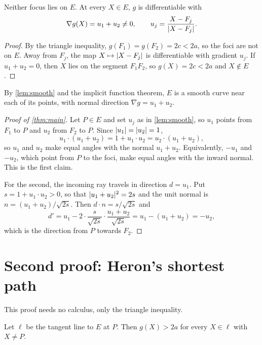 \documentclass[11pt,a4paper]{article}
\begin{document}
\begin{lemma}\label{lem:smooth}
  Neither focus lies on $E$. At every $X \in E$, $g$ is differentiable with
  \[
    \nabla g(X) = u_1 + u_2 \neq 0, \qquad
    u_j = \frac{X - F_j}{\lvert X - F_j\rvert}.
  \]
\end{lemma}

\begin{proof}
  By the triangle inequality, $g(F_1) = g(F_2) = 2c < 2a$, so the foci are not on
  $E$. Away from $F_j$, the map $X \mapsto \lvert X - F_j\rvert$ is differentiable with
  gradient $u_j$. If $u_1 + u_2 = 0$, then $X$ lies on the segment $F_1F_2$, so
  $g(X) = 2c < 2a$ and $X \notin E$.
\end{proof}

By \cref{lem:smooth} and the implicit function theorem, $E$ is a smooth curve near
each of its points, with normal direction $\nabla g = u_1 + u_2$.

\begin{proof}[Proof of \cref{thm:main}]
  Let $P \in E$ and set $u_j$ as in \cref{lem:smooth}, so $u_1$ points from $F_1$
  to $P$ and $u_2$ from $F_2$ to $P$. Since $\lvert u_1\rvert = \lvert u_2\rvert = 1$,
  \[
    u_1 \cdot (u_1 + u_2) = 1 + u_1 \cdot u_2 = u_2 \cdot (u_1 + u_2),
  \]
  so $u_1$ and $u_2$ make equal angles with the normal $u_1 + u_2$. Equivalently,
  $-u_1$ and $-u_2$, which point from $P$ to the foci, make equal angles with the
  inward normal. This is the first claim.

  For the second, the incoming ray travels in direction $d = u_1$. Put
  $s = 1 + u_1 \cdot u_2 > 0$, so that $\lvert u_1 + u_2\rvert^2 = 2s$ and the unit normal is
  $n = (u_1 + u_2)/\sqrt{2s}$. Then $d \cdot n = s / \sqrt{2s}$ and
  \[
    d' = u_1 - 2 \cdot \frac{s}{\sqrt{2s}} \cdot \frac{u_1 + u_2}{\sqrt{2s}}
       = u_1 - (u_1 + u_2) = -u_2 ,
  \]
  which is the direction from $P$ towards $F_2$.
\end{proof}

\section{Second proof: Heron's shortest path}

This proof needs no calculus, only the triangle inequality.

\begin{lemma}\label{lem:support}
  Let $\ell$ be the tangent line to $E$ at $P$. Then $g(X) > 2a$ for every
  $X \in \ell$ with $X \neq P$.
\end{lemma}
\end{document}
